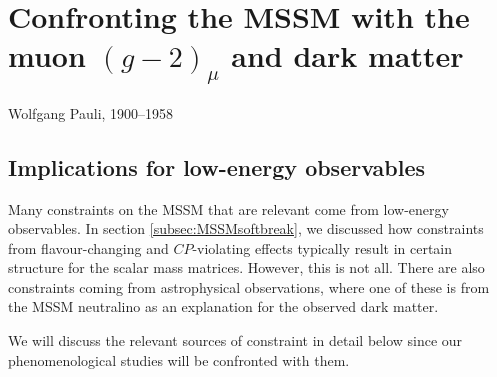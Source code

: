 \chapter{Confronting the MSSM with the muon $(g-2)_{\mu}$ and dark matter}
\label{chap:muong-2}

{Wolfgang Pauli, 1900--1958}

\section{Implications for low-energy observables}
\label{sec:MSSMconstraints}

Many constraints on the MSSM that are relevant come from low-energy observables. In section \ref{subsec:MSSMsoftbreak}, we discussed how constraints from flavour-changing and $CP$-violating effects typically result in certain structure for the scalar mass matrices. However, this is not all. There are also constraints coming from astrophysical observations, where one of these is from the MSSM neutralino as an explanation for the observed dark matter.

We will discuss the relevant sources of constraint in detail below since our phenomenological studies will be confronted with them.

